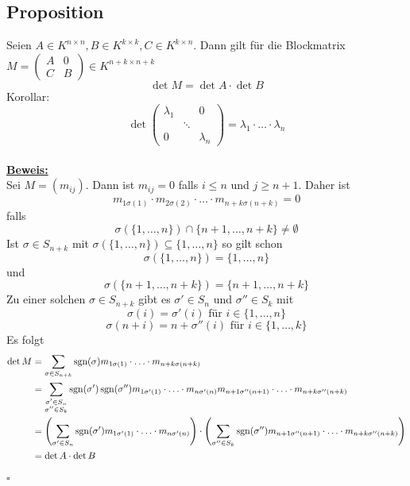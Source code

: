 \subsection{Proposition} %
\label{sub:proposition}
Seien $A \in K^{n \times n}, B \in K^{k \times k}, C \in K^{k \times n}$. 
Dann gilt für die Blockmatrix $M = \left(\begin{smallmatrix}
		A & 0 \\
		C & B
	\end{smallmatrix} \right) \in K^{n+k \times n+k}$
\[
	\det M = \det A \cdot \det B
\]
Korollar: 
\[
	\det \left( \begin{smallmatrix}
		\lambda_1 & & 0 \\
		 & \ddots &  \\
		0 & & \lambda_n
	\end{smallmatrix} \right) = \lambda_1 \cdot \ldots \cdot \lambda_n
\]
\vspace{10pt} \\
\underline{\textbf{Beweis:}} \\
Sei $M=(m_{ij})$. Dann ist $m_{ij}= 0$ falls $i \le n$ und $j \ge n+1$. Daher ist 
\[
	m_{1 \sigma(1)} \cdot m_{2 \sigma(2)} \cdot \ldots \cdot m_{n+k \sigma(n+k)} = 0
\]
falls 
\[
	\sigma ( \{1, \ldots ,n\}) \cap \{ n+1, \ldots , n+k \} \not= \emptyset
\]
Ist $\sigma \in S_{n+k}$ mit $\sigma( \{1, \ldots , n \} ) \subseteq \{ 1, \ldots , n\}$ so gilt schon 
\[
	\sigma(\{ 1, \ldots , n \}) = \{1, \ldots , n \}
\]
und
\[
	\sigma ( \{ n+1, \ldots , n+k\})= \{ n+1, \ldots , n+k\}
\]
Zu einer solchen $\sigma \in S_{n+k}$ gibt es $\sigma' \in S_n$ und $\sigma'' \in S_k$ mit
\[
	\sigma(i)= \sigma'(i) \text{ für } i \in \{ 1, \ldots , n \}
\]
\[
	\sigma(n+i) = n+ \sigma''(i) \text{ für } i \in \{1, \ldots , k \}
\]
Es folgt
\begin{align*}
	\det M &= \sum\limits_{\sigma \in S_{n+k}} \operatorname{sgn}(\sigma) m_{1 \sigma(1)} \cdot \ldots \cdot m_{n+k \sigma(n+k)} \\
	&= \sum\limits_{\substack{\sigma' \in S_n \\ \sigma'' \in S_k}} \operatorname{sgn}(\sigma') \operatorname{sgn}(\sigma'') m_{1 \sigma'(1)} \cdot \ldots \cdot m_{n \sigma'(n)}
	m_{n+1 \sigma''(n+1)} \cdot \ldots \cdot m_{n+k \sigma''(n+k)} \\
	&= \left( \sum\limits_{\sigma' \in S_n} \operatorname{sgn}(\sigma') m_{1 \sigma'(1)} \cdot \ldots \cdot m_{n \sigma'(n)} \right) \cdot 
	\left( \sum\limits_{\sigma'' \in S_k} \operatorname{sgn}(\sigma'')m_{n+1 \sigma''({n+1})} \cdot \ldots \cdot m_{n+k \sigma''(n+k)} \right) \\
	&= \det A \cdot \det B
\end{align*}
\hfill \( \square \)

